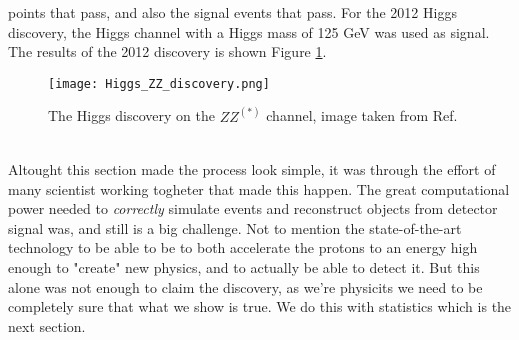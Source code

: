 \documentclass[14pt, a4paper]{book}
\begin{document}
points that pass, and also the signal events that pass. For the 2012 Higgs discovery, the Higgs channel with a Higgs mass of 125 GeV was used as signal. 
The results of the 2012 discovery is shown Figure \ref{fig:Higgs_ZZ}.\\
\begin{figure}[!ht]
	\centering
    \texttt{[image: Higgs\_ZZ\_discovery.png]}
    \caption[The Higgs discovery on the $ZZ^{(*)}$ channel]{The Higgs discovery on the $ZZ^{(*)}$ channel, image taken from Ref. \cite{Higgs_discovery_2012}}\label{fig:Higgs_ZZ}
\end{figure}
\\Altought this section made the process look simple, it was through the effort of many scientist working togheter that made this happen. The great computational power needed to \textit{correctly} simulate events and reconstruct objects from detector signal was, and still is a big challenge.
Not to mention the state-of-the-art technology to be able to be to both accelerate the protons to an energy high enough to "create" new physics, and to actually be able to detect it. But this alone was not enough to claim the discovery, as we're physicits we need 
to be completely sure that what we show is true. We do this with statistics which is the next section.
\clearpage
\end{document}
